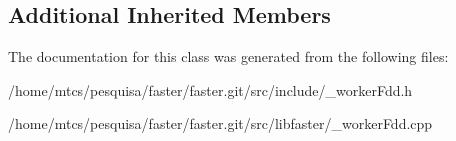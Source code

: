 \subsection*{Additional Inherited Members}


The documentation for this class was generated from the following files\+:\begin{DoxyCompactItemize}
\item 
/home/mtcs/pesquisa/faster/faster.\+git/src/include/\+\_\+worker\+Fdd.\+h\item 
/home/mtcs/pesquisa/faster/faster.\+git/src/libfaster/\+\_\+worker\+Fdd.\+cpp\end{DoxyCompactItemize}

